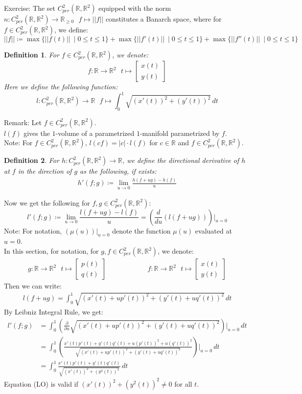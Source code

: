 \documentclass[15pt]{book}
\theoremstyle{break}
\theoremstyle{break}
\newtheorem{defn}{Definition}[corL]
\newcommand{\R}{\mathbb{R}}
\newcommand{\lr}[1]{\left(#1\right)}
\newcommand{\bmat}[1]{\begin{bmatrix} #1 \end{bmatrix}}
\newcommand{\note}{\color{red}Note: \color{black}}
\newcommand{\remark}{\color{blue}Remark: \color{black}}
\newcommand{\exercise}{\color{green}Exercise: \color{black}}
\begin{document}
\exercise The set $C^2_{per}(\R, \R^2)$ equipped with the norm $n:C^2_{per}(\R, \R^2) \to \R_{\geq 0} \ \ \ f\mapsto ||f|| $ constitutes a Banarch space, where for $f \in C^2_{per}(\R, \R^2)$, we define:
$$||f|| \coloneqq \max\{||f(t)||\ \mid 0 \leq t\leq 1\} + \max\{||f'(t)||\ \mid 0 \leq t\leq 1\} + \max\{||f''(t)||\ \mid 0 \leq t\leq 1\}$$

\begin{defn}
For $f\in C^2_{per}(\R, \R^2)$, we denote: 
$$f:\R \to \R^2 \ \ \ t\mapsto \bmat{x(t)\\y(t)}$$ 
Here we define the following function:
$$l:C^2_{per}(\R, \R^2) \to \R \ \ \ f\mapsto \int_0^1 \sqrt{(x'(t))^2 + (y'(t))^2}\, dt$$ 
\end{defn}

\remark Let $f\in C^2_{per}(\R, \R^2)$. \\
$l(f)$ gives the $1$-volume of a parametrized $1$-manifold parametrized by $f$. \\

\note For $f\in C^2_{per}(\R, \R^2)$, $l(cf) = |c| \cdot l(f)$ for $c \in \R$ and $f\in C^2_{per}(\R, \R^2)$. 
\newpage

\begin{defn}
For $h:C^2_{per}(\R, \R^2) \to \R$, we define the directional derivative of $h$ at $f$ in the direction of $g$ as the following, if exists:
\begin{align*}
h'(f;g) \coloneqq \lim_{u \to 0}\frac{h(f+ug) - h(f)}{u}
\end{align*}
\end{defn}

Now we get the following for $f,g \in C^2_{per}(\R, \R^2)$: 
$$l'(f;g) \coloneqq \lim_{u \to 0}\frac{l(f+ug) - l(f)}{u} = \left(\frac{d}{du}(l(f+ug))\right)|_{u = 0}$$
\note For notation, $(\mu(u))|_{u=0}$ denote the function $\mu(u)$ evaluated at $u = 0$.\\

In this section, for notation, for $g,f \in C^2_{per}(\R, \R^2)$, we denote:
\begin{align*}
g:\R \to \R^2 \ \ \ t\mapsto \bmat{p(t)\\ q(t)} \qquad \qquad \qquad f:\R \to \R^2 \ \ \ t\mapsto \bmat{x(t)\\y(t)}
\end{align*}
Then we can write:
\begin{align*}
l(f+ug) = \int_0^1 \sqrt{\lr{x'(t) + up'(t)}^2 + \lr{y'(t) + uq'(t)}^2}\, dt
\end{align*}
By Leibniz Integral Rule, we get:
\begin{align*}
l'(f;g) &= \int_0^1 \left(\frac{\partial}{\partial u}\sqrt{\lr{x'(t) + up'(t)}^2 + \lr{y'(t) + uq'(t)}^2}\right)|_{u=0} \, dt   \\
&= \int_0^1 \left(\frac{x'(t)p'(t)+y'(t)q'(t)+u(p'(t))^2+u(q'(t))^2}{\sqrt{\lr{x'(t) + up'(t)}^2 + \lr{y'(t) + uq'(t)}^2}}\right)|_{u=0} \, dt \\
&= \int_0^1 \frac{x'(t)p'(t)+y'(t) q'(t)}{\sqrt{(x'(t))^2+(y^2(t))^2}}\, dt \tag{LO}
\end{align*}
Equation (LO) is valid if $(x'(t))^2+(y^2(t))^2 \neq 0$ for all $t$.
\end{document}
